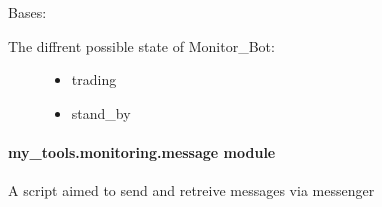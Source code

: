 \documentclass[letterpaper,10pt,english]{sphinxmanual}
\begin{document}
\begin{fulllineitems}
\label{\detokenize{my_tools.monitoring:my_tools.monitoring.bot.State}}
\sphinxAtStartPar
Bases: 
\begin{description}
\item[{The diffrent possible state of Monitor\_Bot:}] \leavevmode\begin{itemize}
\item {} 
\sphinxAtStartPar
trading

\item {} 
\sphinxAtStartPar
stand\_by

\end{itemize}

\end{description}

\begin{fulllineitems}
\label{\detokenize{my_tools.monitoring:my_tools.monitoring.bot.State.stand_by}}
\end{fulllineitems}


\begin{fulllineitems}
\label{\detokenize{my_tools.monitoring:my_tools.monitoring.bot.State.trading}}
\end{fulllineitems}


\end{fulllineitems}



\paragraph{my\_tools.monitoring.message module}
\label{\detokenize{my_tools.monitoring:module-my_tools.monitoring.message}}\label{\detokenize{my_tools.monitoring:my-tools-monitoring-message-module}}
\sphinxAtStartPar
A script aimed to send and retreive messages via messenger
\end{document}
